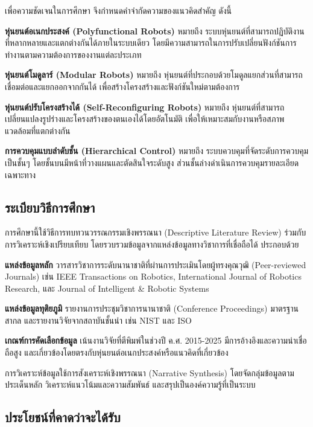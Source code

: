 \documentclass[a4paper]{article}
\begin{document}
เพื่อความชัดเจนในการศึกษา จึงกำหนดคำจำกัดความของแนวคิดสำคัญ ดังนี้

\textbf{หุ่นยนต์อเนกประสงค์ (Polyfunctional Robots)} หมายถึง ระบบหุ่นยนต์ที่สามารถปฏิบัติงานที่หลากหลายและแตกต่างกันได้ภายในระบบเดียว โดยมีความสามารถในการปรับเปลี่ยนฟังก์ชันการทำงานตามความต้องการของงานแต่ละประเภท

\textbf{หุ่นยนต์โมดูลาร์ (Modular Robots)} หมายถึง หุ่นยนต์ที่ประกอบด้วยโมดูลแยกส่วนที่สามารถเชื่อมต่อและแยกออกจากกันได้ เพื่อสร้างโครงสร้างและฟังก์ชันใหม่ตามต้องการ \parencite{bi2016survey}

\textbf{หุ่นยนต์ปรับโครงสร้างได้ (Self-Reconfiguring Robots)} หมายถึง หุ่นยนต์ที่สามารถเปลี่ยนแปลงรูปร่างและโครงสร้างของตนเองได้โดยอัตโนมัติ เพื่อให้เหมาะสมกับงานหรือสภาพแวดล้อมที่แตกต่างกัน \parencite{hameed2017modular}

\textbf{การควบคุมแบบลำดับชั้น (Hierarchical Control)} หมายถึง ระบบควบคุมที่จัดระดับการควบคุมเป็นชั้นๆ โดยชั้นบนมีหน้าที่วางแผนและตัดสินใจระดับสูง ส่วนชั้นล่างดำเนินการควบคุมรายละเอียดเฉพาะทาง

\subsection{ระเบียบวิธีการศึกษา}

การศึกษานี้ใช้วิธีการทบทวนวรรณกรรมเชิงพรรณนา (Descriptive Literature Review) ร่วมกับการวิเคราะห์เชิงเปรียบเทียบ โดยรวบรวมข้อมูลจากแหล่งข้อมูลทางวิชาการที่เชื่อถือได้ ประกอบด้วย

\textbf{แหล่งข้อมูลหลัก} วารสารวิชาการระดับนานาชาติที่ผ่านการประเมินโดยผู้ทรงคุณวุฒิ (Peer-reviewed Journals) เช่น IEEE Transactions on Robotics, International Journal of Robotics Research, และ Journal of Intelligent \& Robotic Systems

\textbf{แหล่งข้อมูลทุติยภูมิ} รายงานการประชุมวิชาการนานาชาติ (Conference Proceedings) มาตรฐานสากล และรายงานวิจัยจากสถาบันชั้นนำ เช่น NIST และ ISO

\textbf{เกณฑ์การคัดเลือกข้อมูล} เน้นงานวิจัยที่ตีพิมพ์ในช่วงปี ค.ศ. 2015-2025 มีการอ้างอิงและความน่าเชื่อถือสูง และเกี่ยวข้องโดยตรงกับหุ่นยนต์อเนกประสงค์หรือแนวคิดที่เกี่ยวข้อง

การวิเคราะห์ข้อมูลใช้การสังเคราะห์เชิงพรรณนา (Narrative Synthesis) โดยจัดกลุ่มข้อมูลตามประเด็นหลัก วิเคราะห์แนวโน้มและความสัมพันธ์ และสรุปเป็นองค์ความรู้ที่เป็นระบบ

\subsection{ประโยชน์ที่คาดว่าจะได้รับ}
\end{document}
